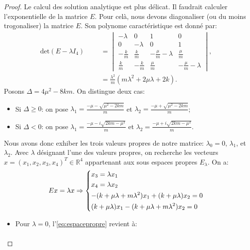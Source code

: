 \begin{proof}

Le calcul des solution analytique est plus délicat. Il faudrait calculer l'exponentielle de la matrice $E$. Pour celà, nous devons diagonaliser (ou du moins trogonaliser) la matrice $E$. Son polynome caractéristique est donné par:
\begin{align*}    
\text{det}(E-\lambda I_4) &&&= \begin{vmatrix}
    -\lambda & 0 & 1 & 0 \\ 0 & -\lambda & 0& 1 \\ -\frac{k}{m} & \frac{k}{m} & -\frac{\mu}{m}-\lambda & \frac{\mu}{m} \\ \frac{k}{m} & -\frac{k}{m} & \frac{\mu}{m} & -\frac{\mu}{m} -\lambda
\end{vmatrix}, \\
    &&&= \frac{\lambda^2}{m} \left( m\lambda^2 + 2\mu\lambda + 2k \right).
\end{align*}
Posons $\Delta = 4\mu^2 - 8km$. On distingue deux cas:
\begin{itemize}
    \item Si $\Delta \geq 0$: on pose $\lambda_1 = \frac{-\mu - \sqrt{\mu^2 - 2km}}{m}$ et $\lambda_2 = \frac{-\mu + \sqrt{\mu^2 - 2km}}{m}$;
    \item Si $\Delta < 0$: on pose $\lambda_1 = \frac{-\mu - i\sqrt{2km - \mu^2}}{m}$ et $\lambda_2 = \frac{-\mu + i\sqrt{2km - \mu^2}}{m}$.
\end{itemize}
Nous avons donc exhiber les trois valeurs propres de notre matrice: $\lambda_0 = 0$, $\lambda_1$, et $\lambda_2$. Avec $\lambda$ désignant l'une des valeurs propres, on recherche les vecteurs $x = (x_1, x_2, x_3, x_4)^T \in \mathbb{R}^4$ appartenant aux sous espaces propres $E_\lambda$. On a:
\begin{align} \label{eq:espacepropre}
    Ex = \lambda x \Rightarrow \begin{dcases}
        x_3 = \lambda x_1 \\
        x_4 = \lambda x_2 \\
        -(k + \mu \lambda + m \lambda^2) x_1 + (k + \mu \lambda) x_2 = 0 \\
        (k + \mu \lambda) x_1 - (k + \mu \lambda + m \lambda^2) x_2 = 0
    \end{dcases}
\end{align}
\begin{itemize}
    \item Pour $\lambda = 0$, l'\cref{eq:espacepropre} revient à:
    \begin{align*}

\end{align*}
\end{itemize}
\end{proof}
